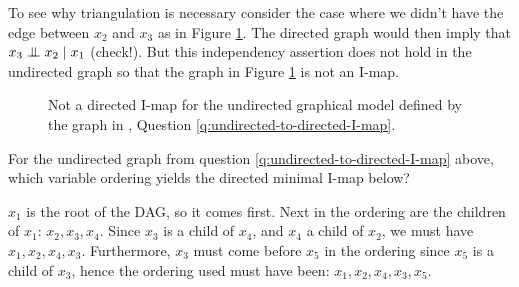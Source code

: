 \begin{exenumerate}
\begin{solution}
\begin{figure}[h!]
    \end{figure}

    To see why triangulation is necessary consider the case where we
    didn't have the edge between $x_2$ and $x_3$ as in Figure
    \ref{fig:triangulation}. The directed graph would then imply that
    $x_3 \mathrel{\perp\mspace{-10mu}\perp} x_2 \mid x_1$ (check!). But this independency assertion
    does not hold in the undirected graph so that the graph in Figure
    \ref{fig:triangulation} is not an I-map.
  
     \begin{figure}[h!]
       \centering
       \caption{\label{fig:triangulation} Not a directed I-map for the undirected graphical model defined by the graph in , Question \ref{q:undirected-to-directed-I-map}.}
     \end{figure}
  \end{solution}

\item For the undirected graph from question
  \ref{q:undirected-to-directed-I-map} above, which variable ordering
  yields the directed minimal I-map below?
  \label{q:undirected-to-directed-I-map-chordal-graph-variable-ordering}
  \begin{center}
  \end{center}

  \begin{solution}
    $x_1$ is the root of the DAG, so it comes first. Next in the ordering
    are the children of $x_1$: $x_2, x_3, x_4$. Since $x_3$ is a child
    of $x_4$, and $x_4$ a child of $x_2$, we must have $x_1, x_2, x_4, x_3$. Furthermore, $x_3$ must come before $x_5$ in the ordering
    since $x_5$ is a child of $x_3$, hence the ordering used must have
    been: $x_1, x_2, x_4, x_3, x_5$.
    
  \end{solution}
  
\end{exenumerate}
  

